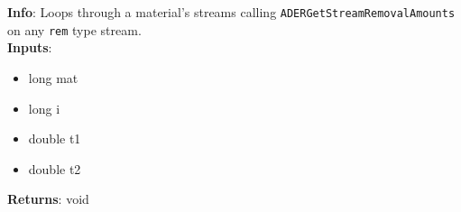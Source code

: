 \textbf{Info}: Loops through a material's streams calling
\texttt{ADERGetStreamRemovalAmounts} on any \texttt{rem} type stream.\\

\noindent \textbf{Inputs}:
\begin{itemize}
\item{long mat}
\item{long i}
\item{double t1}
\item{double t2}
\end{itemize}

\noindent \textbf{Returns}: void
